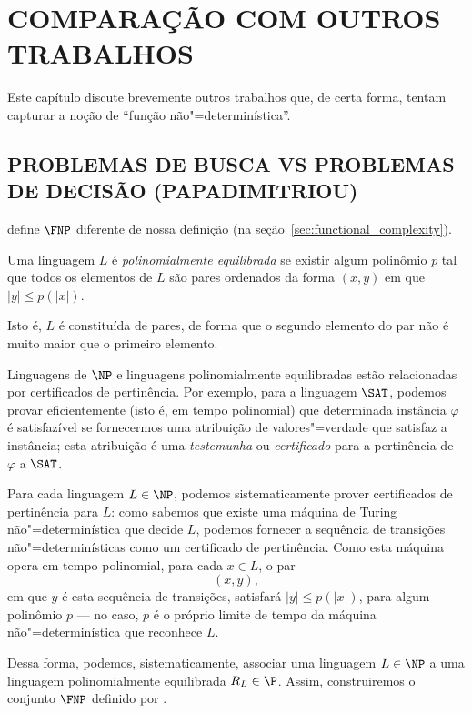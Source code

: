 \chapter{COMPARAÇÃO COM OUTROS TRABALHOS}

Este capítulo discute brevemente outros trabalhos que,
de certa forma,
tentam capturar a noção de ``função não"=determinística''.

\section{PROBLEMAS DE BUSCA VS PROBLEMAS DE DECISÃO (PAPADIMITRIOU)}
\label{sec:papadimitriou_comparison}

define $\FNP$ diferente de nossa definição
(na seção~\ref{sec:functional_complexity}).

\begin{definition}
    Uma linguagem $L$ é \emph{polinomialmente equilibrada}
    se existir algum polinômio $p$ tal que
    todos os elementos de $L$ são pares ordenados da forma $(x, y)$
    em que $|y| \leq p(|x|)$.
\end{definition}
Isto é, $L$ é constituída de pares,
de forma que o segundo elemento do par não é muito maior que o primeiro elemento.

Linguagens de $\NP$ e linguagens polinomialmente equilibradas
estão relacionadas por certificados de pertinência.
Por exemplo,
para a linguagem $\SAT$,
podemos provar eficientemente
(isto é, em tempo polinomial)
que determinada instância $\varphi$ é satisfazível
se fornecermos uma atribuição de valores"=verdade que satisfaz a instância;
esta atribuição é uma \emph{testemunha} ou \emph{certificado}
para a pertinência de $\varphi$ a $\SAT$.

Para cada linguagem $L \in \NP$,
podemos sistematicamente prover certificados de pertinência para $L$:
como sabemos que existe uma máquina de Turing não"=determinística que decide $L$,
podemos fornecer a sequência de transições não"=determinísticas
como um certificado de pertinência.
Como esta máquina opera em tempo polinomial,
para cada $x \in L$,
o par
\begin{equation*}
    (x, y),
\end{equation*}
em que $y$ é esta sequência de transições,
satisfará $|y| \leq p(|x|)$,
para algum polinômio $p$
--- no caso, $p$ é o próprio limite de tempo da máquina não"=determinística
que reconhece $L$.

Dessa forma,
podemos, sistematicamente,
associar uma linguagem $L \in \NP$
a uma linguagem polinomialmente equilibrada $R_L \in \P$.
Assim,
construiremos o conjunto $\FNP$ definido por .


